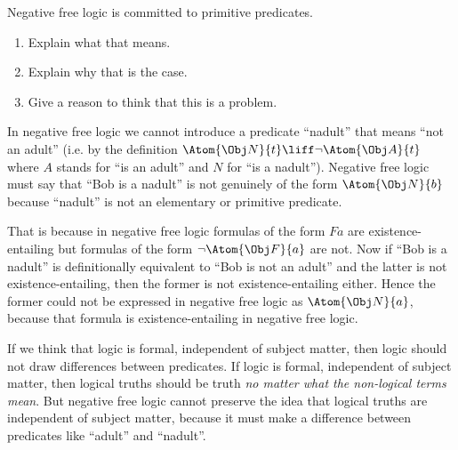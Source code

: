 \documentclass[../../../include/open-logic-section]{subfiles}
\begin{document}
\begin{prob}
Negative free logic is committed to primitive predicates.
\begin{enumerate}
	\item Explain what that means.
	\item Explain why that is the case.
	\item Give a reason to think that this is a problem.
\end{enumerate}
\begin{ans}
\item In negative free logic we cannot introduce a predicate ``nadult'' 
	that means ``not an adult'' (i.e. by the definition $\Atom{\Obj N}{t} \liff 
	\lnot \Atom{\Obj A}{t}$ where $A$ stands for ``is an adult'' and 
	$N$ for ``is a nadult''). Negative free logic must say that 
	``Bob is a nadult'' is not genuinely of the form $\Atom{\Obj N}{b}$ because
	``nadult'' is not an elementary or primitive predicate.
\item That is because in negative free logic formulas of the form $Fa$ are
	existence-entailing but  formulas of the form $\lnot \Atom{\Obj F}{a}$ are not. Now
	if ``Bob is a nadult'' is definitionally equivalent to
	``Bob is not an adult'' and the latter is not existence-entailing, 
	then the former is not existence-entailing either. Hence the former
	could not be expressed in negative free logic as $\Atom{\Obj N}{a}$, 
	because that formula is existence-entailing in negative free logic.
\item If we think that logic is formal, independent of subject matter,
	then logic should not draw differences between predicates. If logic is
	formal, independent of subject matter, then logical truths should be 
	truth \emph{no matter what the non-logical terms mean}. But negative
	free logic cannot preserve the idea that logical truths are 
	independent of subject matter, because it must make a difference
	between predicates like ``adult'' and ``nadult''. 
\end{ans}
\end{prob}
\end{document}
